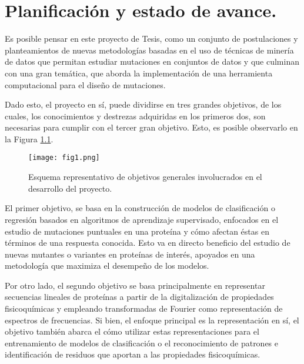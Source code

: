 \chapter{Planificación y estado de avance.}

\ifpdf
    \graphicspath{{Chapter5/Figs/Raster/}{Chapter5/Figs/PDF/}{Chapter5/Figs/}}
\else
    \graphicspath{{Chapter5/Figs/Vector/}{Chapter5/Figs/}}
\fi

Es posible pensar en este proyecto de Tesis, como un conjunto de postulaciones y planteamientos de nuevas metodologías basadas en el uso de técnicas de minería de datos que permitan estudiar mutaciones en conjuntos de datos y que culminan con una gran temática, que aborda la implementación de una herramienta computacional para el diseño de mutaciones.

Dado esto, el proyecto en sí, puede dividirse en tres grandes objetivos, de los cuales, los conocimientos y destrezas adquiridas en los primeros dos, son necesarias para cumplir con el tercer gran objetivo. Esto, es posible observarlo en la Figura \ref{cap5:fig1}.

\begin{figure}[!h]
	
	\centering
	\texttt{[image: fig1.png]}
	\caption{Esquema representativo de objetivos generales involucrados en el desarrollo del proyecto.}
	\label{cap5:fig1}
\end{figure}

El primer objetivo, se basa en la construcción de modelos de clasificación o regresión basados en algoritmos de aprendizaje supervisado, enfocados en el estudio de mutaciones puntuales en una proteína y cómo afectan éstas en términos de una respuesta conocida. Esto va en directo beneficio del estudio de nuevas mutantes o variantes en proteínas de interés, apoyados en una metodología que maximiza el desempeño de los modelos. 

Por otro lado, el segundo objetivo se basa principalmente en representar secuencias lineales de proteínas a partir de la digitalización de propiedades fisicoquímicas y empleando transformadas de Fourier como representación de espectros de frecuencias. Si bien, el enfoque principal es la representación en sí, el objetivo también abarca el cómo utilizar estas representaciones para el entrenamiento de modelos de clasificación o el reconocimiento de patrones e identificación de residuos que aportan a las propiedades fisicoquímicas.

